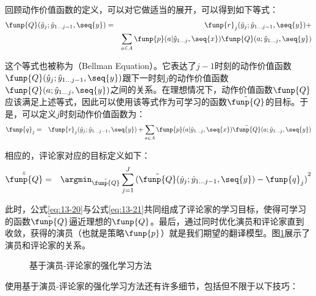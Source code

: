 \parinterval 回顾动作价值函数的定义，可以对它做适当的展开，可以得到如下等式：
\begin{eqnarray}
\funp{Q}(\hat{{y}}_j;\hat{{y}}_{1 \ldots j -1},\seq{y}) & = & \funp{r}_j(\hat{{y}}_j;\hat{{y}}_{1 \ldots j-1},\seq{y}) + \nonumber \\
&   & \sum_{a \in A}\funp{p}(a|\hat{{y}}_{1 \ldots j},\seq{x})\funp{Q}(a;\hat{{y}}_{1 \ldots j},\seq{y})
\label{eq:13-19}
\end{eqnarray}

\parinterval 这个等式也被称为{\small{}}（Bellman Equation）。它表达了$j-1$时刻的动作价值函数$\funp{Q}(\hat{{y}}_j;\hat{{y}}_{1 \ldots j-1},\seq{y})$跟下一时刻$j$的动作价值函数$\funp{Q}(a;\hat{{y}}_{1 \ldots j},\seq{y})$之间的关系。在理想情况下，动作价值函数$\funp{Q}$应该满足上述等式，因此可以使用该等式作为可学习的函数$\tilde{\funp{Q}}$的目标。于是，可以定义$j$时刻动作价值函数为：
\begin{eqnarray}
\funp{q}_j & = &  \funp{r}_j(\hat{{y}}_j;\hat{{y}}_{1 \ldots j-1},\seq{y}) + \sum_{a \in A}\funp{p}(a|\hat{{y}}_{1 \ldots j},\seq{x})\tilde{\funp{Q}}(a;\hat{{y}}_{1 \ldots j},\seq{y})
\label{eq:13-20}
\end{eqnarray}

\noindent 相应的，评论家对应的目标定义如下：
\begin{eqnarray}
\hat{\tilde{\funp{Q}}} & = & \argmin_{\tilde{\funp{Q}}}\sum_{j=1}^J{(\tilde{\funp{Q}}(\hat{{y}}_j;\hat{{y}}_{1 \ldots j-1},\seq{y}) - \funp{q}_j)}^2
\label{eq:13-21}
\end{eqnarray}

\parinterval 此时，公式\ref{eq:13-20}与公式\ref{eq:13-21}共同组成了评论家的学习目标，使得可学习的函数$\tilde{\funp{Q}}$逼近理想的$\funp{Q}$。最后，通过同时优化演员和评论家直到收敛，获得的演员（也就是策略$\funp{p}$）就是我们期望的翻译模型。图\ref{fig:13-11}展示了演员和评论家的关系。

\begin{figure}[htp]
\centering

\caption{基于演员-评论家的强化学习方法}
\label{fig:13-11}
\end{figure}

\parinterval 使用基于演员-评论家的强化学习方法还有许多细节，包括但不限于以下技巧：

